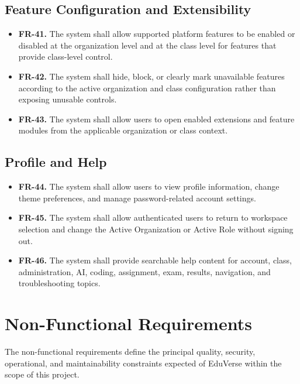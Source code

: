 \subsection*{Feature Configuration and Extensibility}

\begin{itemize}
  \item \textbf{FR-41.} The system shall allow supported platform features to
    be enabled or disabled at the organization level and at the class level for
    features that provide class-level control.
  \item \textbf{FR-42.} The system shall hide, block, or clearly mark
    unavailable features according to the active organization and class
    configuration rather than exposing unusable controls.
  \item \textbf{FR-43.} The system shall allow users to open enabled extensions
    and feature modules from the applicable organization or class context.
\end{itemize}

\subsection*{Profile and Help}

\begin{itemize}
  \item \textbf{FR-44.} The system shall allow users to view profile
    information, change theme preferences, and manage password-related account
    settings.
  \item \textbf{FR-45.} The system shall allow authenticated users to return to
    workspace selection and change the Active Organization or Active Role
    without signing out.
  \item \textbf{FR-46.} The system shall provide searchable help content for
    account, class, administration, AI, coding, assignment, exam, results,
    navigation, and troubleshooting topics.
\end{itemize}

\section{Non-Functional Requirements}\label{sec:non_functional_requirements}

The non-functional requirements define the principal quality, security, operational, and maintainability constraints expected of EduVerse within the scope of this project.

